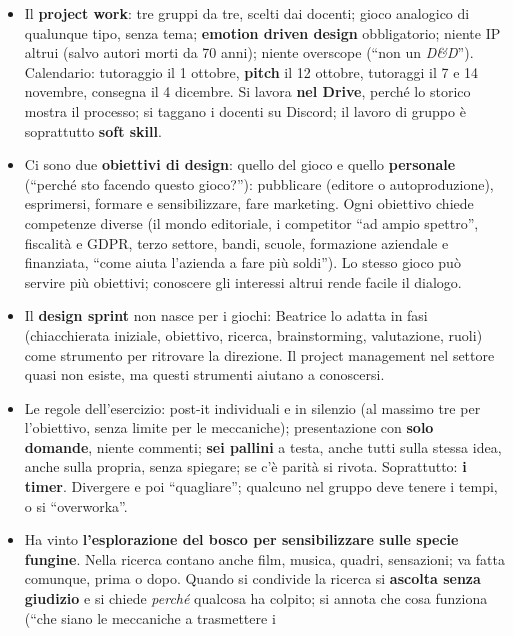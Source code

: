 \begin{itemize}
  \item Il \textbf{project work}: tre gruppi da tre, scelti dai docenti; gioco
        analogico di qualunque tipo, senza tema; \textbf{emotion driven design}
        obbligatorio; niente IP altrui (salvo autori morti da 70 anni); niente
        overscope (``non un \emph{D\&D}''). Calendario: tutoraggio il 1 ottobre,
        \textbf{pitch} il 12 ottobre, tutoraggi il 7 e 14 novembre, consegna il 4
        dicembre. Si lavora \textbf{nel Drive}, perché lo storico mostra il processo;
        si taggano i docenti su Discord; il lavoro di gruppo è soprattutto
        \textbf{soft skill}.
  \item Ci sono due \textbf{obiettivi di design}: quello del gioco e quello
        \textbf{personale} (``perché sto facendo questo gioco?''): pubblicare
        (editore o autoproduzione), esprimersi, formare e sensibilizzare, fare
        marketing. Ogni obiettivo chiede competenze diverse (il mondo editoriale, i
        competitor ``ad ampio spettro'', fiscalità e GDPR, terzo settore, bandi,
        scuole, formazione aziendale e finanziata, ``come aiuta l'azienda a fare più
        soldi''). Lo stesso gioco può servire più obiettivi; conoscere gli interessi
        altrui rende facile il dialogo.
  \item Il \textbf{design sprint} non nasce per i giochi: Beatrice lo adatta in fasi
        (chiacchierata iniziale, obiettivo, ricerca, brainstorming, valutazione, ruoli)
        come strumento per ritrovare la direzione. Il project management nel settore
        quasi non esiste, ma questi strumenti aiutano a conoscersi.
  \item Le regole dell'esercizio: post-it individuali e in silenzio (al massimo tre
        per l'obiettivo, senza limite per le meccaniche); presentazione con \textbf{solo
        domande}, niente commenti; \textbf{sei pallini} a testa, anche tutti sulla
        stessa idea, anche sulla propria, senza spiegare; se c'è parità si rivota.
        Soprattutto: \textbf{i timer}. Divergere e poi ``quagliare''; qualcuno nel
        gruppo deve tenere i tempi, o si ``overworka''.
  \item Ha vinto \textbf{l'esplorazione del bosco per sensibilizzare sulle specie
        fungine}. Nella ricerca contano anche film, musica, quadri, sensazioni; va
        fatta comunque, prima o dopo. Quando si condivide la ricerca si
        \textbf{ascolta senza giudizio} e si chiede \emph{perché} qualcosa ha colpito;
        si annota che cosa funziona (``che siano le meccaniche a trasmettere i

\end{itemize}
